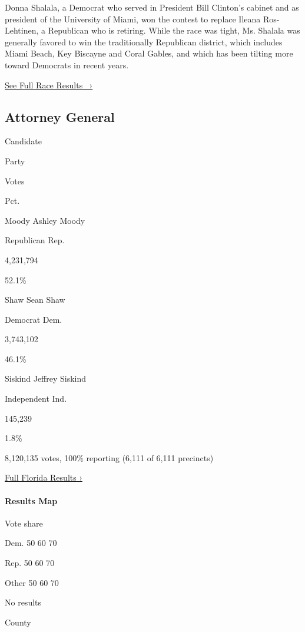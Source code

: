 Donna Shalala, a Democrat who served in President Bill Clinton's cabinet
and as president of the University of Miami, won the contest to replace
Ileana Ros-Lehtinen, a Republican who is retiring. While the race was
tight, Ms. Shalala was generally favored to win the traditionally
Republican district, which includes Miami Beach, Key Biscayne and Coral
Gables, and which has been tilting more toward Democrats in recent
years.

\href{https://www.nytimes3xbfgragh.onion/elections/results/florida-house-district-27}{See
Full Race Results~ ›}

\hypertarget{attorney-general}{%
\subsection{Attorney General}\label{attorney-general}}

Candidate

Party

Votes

Pct.

 Moody Ashley Moody

Republican Rep.

4,231,794

52.1\%

 Shaw Sean Shaw

Democrat Dem.

3,743,102

46.1\%

 Siskind Jeffrey Siskind

Independent Ind.

145,239

1.8\%

8,120,135 votes, 100\% reporting (6,111 of 6,111 precincts)

\href{https://www.nytimes3xbfgragh.onion/interactive/2018/11/06/us/elections/results-florida-elections.html}{Full
Florida Results ›}

\hypertarget{results-map-2}{%
\paragraph{Results Map}\label{results-map-2}}

Vote share

Dem. 50 60 70

Rep. 50 60 70

Other 50 60 70

No results

County

